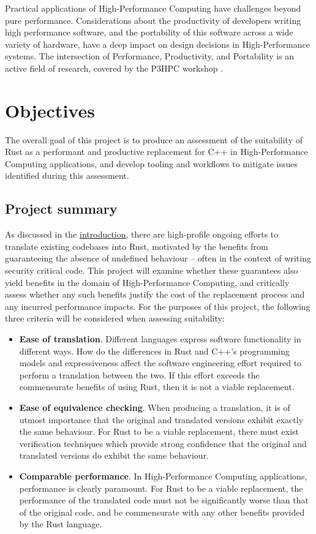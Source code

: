 Practical applications of High-Performance Computing have challenges beyond pure performance. Considerations about the productivity of developers writing high performance software, and the portability of this software across a wide variety of hardware, have a deep impact on design decisions in High-Performance systems. The intersection of Performance, Productivity, and Portability is an active field of research, covered by the P3HPC workshop \cite{P3HPC}.



\section{Objectives}
\label{sec:objectives}

The overall goal of this project is to produce an assessment of the suitability of Rust as a performant and productive replacement for C++ in High-Performance Computing applications, and develop tooling and workflows to mitigate issues identified during this assessment.

\subsection{Project summary}
\label{ssec:objectives-summary}

As discussed in the \hyperref[ch:introduction]{introduction}, there are high-profile ongoing efforts to translate existing codebases into Rust, motivated by the benefits from guaranteeing the absence of undefined behaviour -- often in the context of writing security critical code. This project will examine whether these guarantees also yield benefits in the domain of High-Performance Computing, and critically assess whether any such benefits justify the cost of the replacement process and any incurred performance impacts. For the purposes of this project, the following three criteria will be considered when assessing suitability:

\begin{itemize}
    \item \textbf{Ease of translation}. Different languages express software functionality in different ways. How do the differences in Rust and C++'s programming models and expressiveness affect the software engineering effort required to perform a translation between the two. If this effort exceeds the commensurate benefits of using Rust, then it is not a viable replacement.
    \item \textbf{Ease of equivalence checking}. When producing a translation, it is of utmost importance that the original and translated versions exhibit exactly the same behaviour. For Rust to be a viable replacement, there must exist verification techniques which provide strong confidence that the original and translated versions do exhibit the same behaviour.
    \item \textbf{Comparable performance}. In High-Performance Computing applications, performance is clearly paramount. For Rust to be a viable replacement, the performance of the translated code must not be significantly worse than that of the original code, and be commensurate with any other benefits provided by the Rust language.
\end{itemize}

